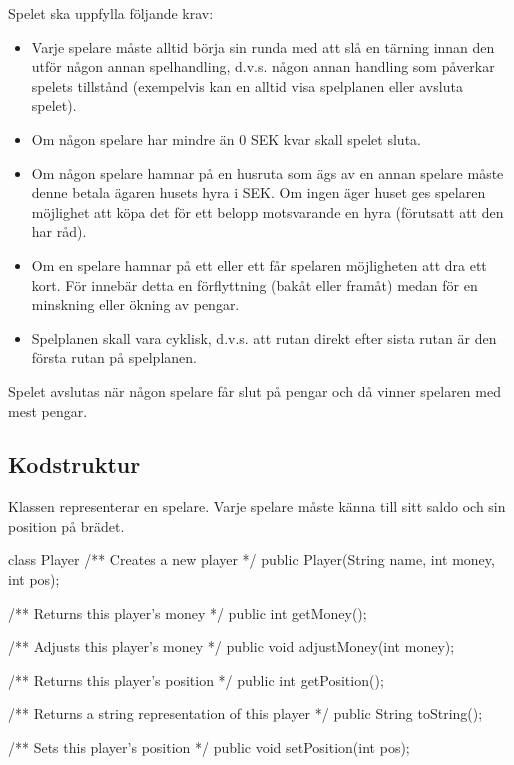 Spelet ska uppfylla följande krav:
\begin{itemize}
\item Varje spelare måste alltid börja sin runda med att slå en tärning innan den utför någon annan spelhandling, d.v.s. någon annan handling som påverkar spelets tillstånd (exempelvis kan en alltid visa spelplanen eller avsluta spelet).
\item Om någon spelare har mindre än 0 SEK kvar skall spelet sluta.
\item Om någon spelare hamnar på en husruta som ägs av en annan spelare måste denne betala ägaren husets hyra i SEK. Om ingen äger huset ges spelaren möjlighet att köpa det för ett belopp motsvarande en hyra (förutsatt att den har råd).
\item Om en spelare hamnar på ett  eller ett  får spelaren möjligheten att dra ett kort. För  innebär detta en förflyttning (bakåt eller framåt) medan för  en minskning eller ökning av pengar.
\item Spelplanen skall vara cyklisk, d.v.s. att rutan direkt efter sista rutan är den första rutan på spelplanen.
\end{itemize}

Spelet avslutas när någon spelare får slut på pengar och då vinner spelaren med mest pengar.

\subsection{Kodstruktur}

Klassen  representerar en spelare. Varje spelare måste känna till sitt saldo och sin position på brädet.

\begin{JavaSpec}{class Player}
	/** Creates a new player */
	public Player(String name, int money, int pos);

	/** Returns this player's money */
	public int getMoney();

	/** Adjusts this player's money */
	public void adjustMoney(int money);

	/** Returns this player's position */
	public int getPosition();

	/** Returns a string representation of this player */
	public String toString();

	/** Sets this player's position */
	public void setPosition(int pos);

\end{JavaSpec}

